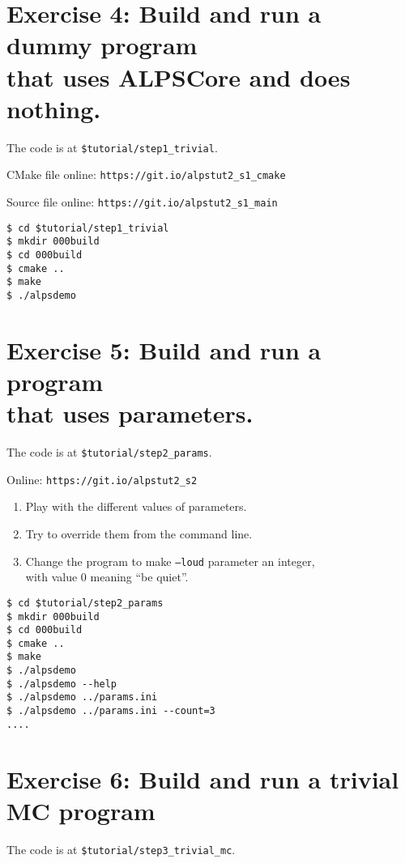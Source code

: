\documentclass[12pt]{article}
\newcommand{\code}[1]{\texttt{#1}}
\begin{document}
\section{Exercise 4: Build and run a dummy program\\ that uses ALPSCore and does nothing.}

The code is at \texttt{\color{ballblue}\$tutorial/step1\_trivial}.

CMake file online: \nolinkurl{https://git.io/alpstut2_s1_cmake}

Source file online: \nolinkurl{https://git.io/alpstut2_s1_main}

\begin{lstlisting}[emph={cd,mkdir}]
$ cd $tutorial/step1_trivial
$ mkdir 000build
$ cd 000build
$ cmake ..
$ make
$ ./alpsdemo
\end{lstlisting}%

\section{Exercise 5: Build and run a program\\ that uses parameters.}

The code is at \texttt{\color{ballblue}\$tutorial/step2\_params}.

Online: \nolinkurl{https://git.io/alpstut2_s2}

\begin{enumerate}
\item Play with the different values of parameters.
\item Try to override them from the command line.
\item Change the program to make \code{--loud} parameter an integer,\\
      with value 0 meaning ``be quiet''.
\end{enumerate}

\begin{lstlisting}[emph={cd,mkdir}]
$ cd $tutorial/step2_params
$ mkdir 000build
$ cd 000build
$ cmake ..
$ make
$ ./alpsdemo
$ ./alpsdemo --help
$ ./alpsdemo ../params.ini
$ ./alpsdemo ../params.ini --count=3
....
\end{lstlisting}

\section{Exercise 6: Build and run a trivial MC program}

The code is at \texttt{\color{ballblue}\$tutorial/step3\_trivial\_mc}.
\end{document}
